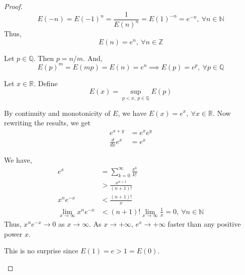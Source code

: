 \begin{proof}
	\[ E(-n) = E(-1)^n = \frac{1}{E(n)^n} = E(1)^{-n} = e^{-n},\ \forall n \in \mathbb{N} \]
	Thus,
	\[ E(n) = e^n,\ \forall n \in \mathbb{Z} \]

	Let $p \in \mathbb{Q}$.
	Then $p = n/m$.
	And,
	\[ E(p)^m = E(mp) = E(n) = e^n \implies E(p) = e^p,\ \forall p \in \mathbb{Q} \]

	Let $x \in \mathbb{R}$.
	Define 
	\[ E(x) = \sup_{p < x,\ p \in \mathbb{Q}} E(p) \]

	By continuity and monotonicity of $E$, we have $E(x) = e^x,\ \forall x \in \mathbb{R}$.
	Now rewriting the results, we get
	\begin{eqnarray}
		e^{x+y} &= e^x e^y \\
		\frac{d}{dx} e^x &= e^x 
	\end{eqnarray}

	We have,
	\begin{align*}
		e^x 
		& = \sum_{k=0}^\infty \frac{x^k}{k!} \\
		& > \frac{x^{n+1}}{(n+1)!} \\
		x^n e^{-x}
		& < \frac{(n+1)!}{x} \\
		\lim_{x \to \infty} x^n e^{-x} & < (n+1)! \lim_{x \to \infty} \frac{1}{x} = 0,\ \forall n \in \mathbb{N}
	\end{align*}
	Thus, $x^n e^{-x} \to 0$ as $x \to \infty$.
	As $x \to +\infty$, $e^{x} \to +\infty$ faster than any positive power $x$.
	\begin{important}
		This is no surprise since $E(1) = e > 1 = E(0)$.
	\end{important}
\end{proof}

